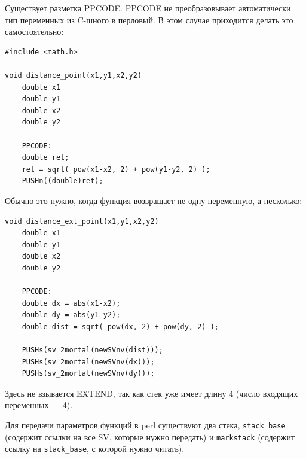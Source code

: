 Существует разметка PPCODE. PPCODE не преобразовывает автоматически тип переменных из C-шного в перловый. В этом случае приходится делать это самостоятельно:
\begin{verbatim}
#include <math.h>

void distance_point(x1,y1,x2,y2)
    double x1
    double y1
    double x2
    double y2

    PPCODE:
    double ret;
    ret = sqrt( pow(x1-x2, 2) + pow(y1-y2, 2) );
    PUSHn((double)ret);
\end{verbatim}
Обычно это нужно, когда функция возвращает не одну переменную, а несколько:
\begin{verbatim}
void distance_ext_point(x1,y1,x2,y2)
    double x1
    double y1
    double x2
    double y2

    PPCODE:
    double dx = abs(x1-x2);
    double dy = abs(y1-y2);
    double dist = sqrt( pow(dx, 2) + pow(dy, 2) );

    PUSHs(sv_2mortal(newSVnv(dist)));
    PUSHs(sv_2mortal(newSVnv(dx)));
    PUSHs(sv_2mortal(newSVnv(dy)));
\end{verbatim}
Здесь не взывается EXTEND, так как стек уже имеет длину 4 (число входящих переменных --- 4).

Для передачи параметров функций в perl существуют два стека, \verb|stack_base| (содержит ссылки на все SV, которые нужно передать) и \verb|markstack| (содержит ссылку на \verb|stack_base|, с которой нужно читать).

